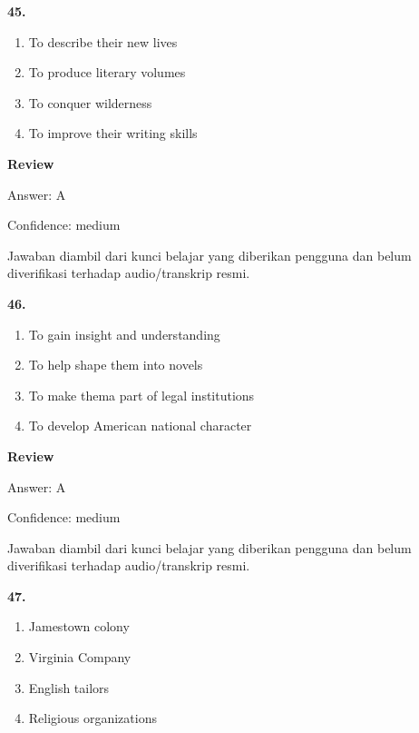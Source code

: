 \documentclass[12pt]{article}
\begin{document}
\noindent\textbf{45.}
\begin{enumerate}[label=(\Alph*),leftmargin=*,itemsep=0.2em]
\item To describe their new lives
\item To produce literary volumes
\item To conquer wilderness
\item To improve their writing skills
\end{enumerate}
\par
\begingroup
\setlength{\parskip}{0pt}
\setlength{\parindent}{0pt}
\textbf{Review}\par
Answer: A\par
Confidence: medium\par
Jawaban diambil dari kunci belajar yang diberikan pengguna dan belum diverifikasi terhadap audio/transkrip resmi.\par
\endgroup
\par
\vspace{0.25\baselineskip}
\noindent\textbf{46.}
\begin{enumerate}[label=(\Alph*),leftmargin=*,itemsep=0.2em]
\item To gain insight and understanding
\item To help shape them into novels
\item To make thema part of legal institutions
\item To develop American national character
\end{enumerate}
\par
\begingroup
\setlength{\parskip}{0pt}
\setlength{\parindent}{0pt}
\textbf{Review}\par
Answer: A\par
Confidence: medium\par
Jawaban diambil dari kunci belajar yang diberikan pengguna dan belum diverifikasi terhadap audio/transkrip resmi.\par
\endgroup
\par
\vspace{0.25\baselineskip}
\noindent\textbf{47.}
\begin{enumerate}[label=(\Alph*),leftmargin=*,itemsep=0.2em]
\item Jamestown colony
\item Virginia Company
\item English tailors
\item Religious organizations
\end{enumerate}
\par
\begingroup
\end{document}

